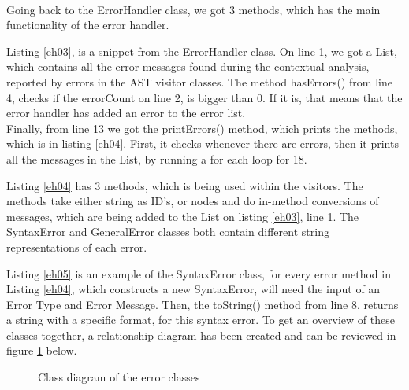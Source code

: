 \\
Going back to the ErrorHandler class, we got 3 methods, which has the main functionality of the error handler. 

\noindent\newline
Listing \ref{eh03}, is a snippet from the ErrorHandler class. On line 1, we got a List, which contains all the error messages found during the contextual analysis, reported by errors in the AST visitor classes. The method hasErrors() from line 4, checks if the errorCount on line 2, is bigger than 0. If it is, that means that the error handler has added an error to the error list.\\
Finally, from line 13 we got the printErrors() method, which prints the methods, which is in listing \ref{eh04}. First, it checks whenever there are errors, then it prints all the messages in the List, by running a for each loop for 18. 

\noindent\newline
Listing \ref{eh04} has 3 methods, which is being used within the visitors. The methods take either string as ID’s, or nodes and do in-method conversions of messages, which are being added to the List on listing \ref{eh03}, line 1. The SyntaxError and GeneralError classes both contain different string representations of each error. 

\noindent\newline
Listing \ref{eh05} is an example of the SyntaxError class, for every error method in Listing \ref{eh04}, which constructs a new SyntaxError, will need the input of an Error Type and Error Message. Then, the toString() method from line 8, returns a string with a specific format, for this syntax error. 
To get an overview of these classes together, a relationship diagram has been created and can be reviewed in figure \ref{eh06} below.
\begin{figure}[H]
\centering
{}
\caption{Class diagram of the error classes}
\label{eh06}
\end{figure}